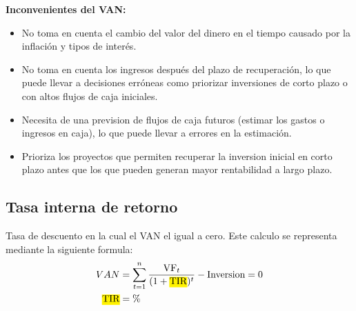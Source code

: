 \documentclass{templateNote}
\begin{document}
\textbf{Inconvenientes del VAN:}
\begin{itemize}
    \item No toma en cuenta el cambio del valor del dinero en el tiempo causado por la inflación y tipos de interés.
    \item No toma en cuenta los ingresos después del plazo de recuperación, lo que puede llevar a decisiones erróneas como priorizar inversiones de corto plazo o con altos flujos de caja iniciales.
    \item Necesita de una prevision de flujos de caja futuros (estimar los gastos o ingresos en caja), lo que puede llevar a errores en la estimación.
    \item Prioriza los proyectos que permiten recuperar la inversion inicial en corto plazo antes que los que pueden generan mayor rentabilidad a largo plazo.
\end{itemize}

\subsection{Tasa interna de retorno}
\noindent Tasa de descuento en la cual el VAN el igual a cero. Este calculo se representa mediante la siguiente formula:
\begin{align*}
    VAN &= \sum_{t=1}^{n} \frac{{\textnormal{VF}}_t}{(1 + \textnormal{\hl{TIR}})^t} - \textnormal{Inversion} = 0\\
    \textnormal{\hl{TIR}} &= \% 
\end{align*}
\end{document}
